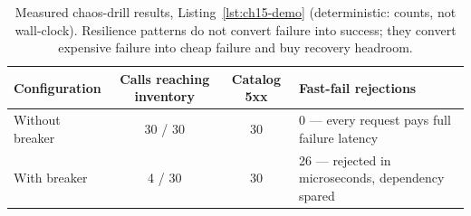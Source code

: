 \begin{table}[h]
  \centering
  \small
  \begin{tabularx}{\textwidth}{l c c X}
    \toprule
    \textbf{Configuration} & \textbf{Calls reaching inventory} & \textbf{Catalog 5xx} & \textbf{Fast-fail rejections} \\
    \midrule
    Without breaker & 30 / 30 & 30 & 0 --- every request pays full failure latency \\
    With breaker & 4 / 30 & 30 & 26 --- rejected in microseconds, dependency spared \\
    \bottomrule
  \end{tabularx}
  \caption{Measured chaos-drill results, Listing~\ref{lst:ch15-demo}
  (deterministic: counts, not wall-clock). Resilience patterns do not
  convert failure into success; they convert expensive failure into cheap
  failure and buy recovery headroom.}
  \label{tab:ch15-drill}
\end{table}

